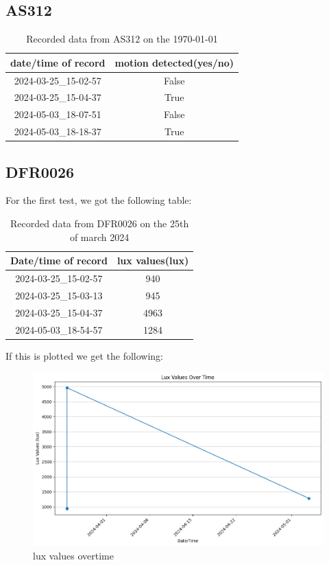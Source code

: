 \subsection{AS312}
\begin{table}[h!]
    \centering
    \begin{tabular}{|c|c|}
        \hline
        date/time of record & motion detected(yes/no)\\
        \hline \hline
        2024-03-25\_15-02-57&False \\
        2024-03-25\_15-04-37&True\\
        2024-05-03\_18-07-51&False\\
        2024-05-03\_18-18-37&True\\
        \hline
    \end{tabular}
    \caption{Recorded data from  AS312 on the \today}
    \label{Recorded data from  AS312 on the \today}
\end{table}
\subsection{DFR0026}
For the first test, we got  the following table: 
\begin{table}[h!]
    \centering
    \begin{tabular}{|c|c|}
        \hline
        Date/time of record & lux values(lux)\\
        \hline \hline
        2024-03-25\_15-02-57&940\\
        2024-03-25\_15-03-13&945\\
        2024-03-25\_15-04-37&4963\\
        2024-05-03\_18-54-57&1284\\
        \hline
    \end{tabular}
    \caption{Recorded data from DFR0026 on the 25th of march 2024}
    \label{Recorded data from DFR0026 on the 25th of march 2024}
\end{table}
If this is plotted we get the following:
\begin{figure}[h!]
    \centering
    \includegraphics[width=0.5\linewidth]{Images/lux_values_overtime.png}
    \caption{lux values overtime}
    \label{lux values overtime}
\end{figure}
\newpage
